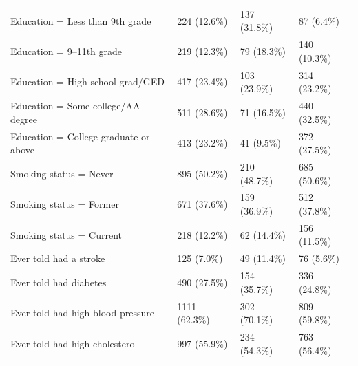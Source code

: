 \documentclass[12pt]{article}
\begin{document}
\begin{longtable}{p{6.6cm}R{2.6cm}R{2.6cm}R{2.6cm}}
Education = Less than 9th grade & 224 (12.6\%) & 137 (31.8\%) & 87 (6.4\%) \\
Education = 9--11th grade & 219 (12.3\%) & 79 (18.3\%) & 140 (10.3\%) \\
Education = High school grad/GED & 417 (23.4\%) & 103 (23.9\%) & 314 (23.2\%) \\
Education = Some college/AA degree & 511 (28.6\%) & 71 (16.5\%) & 440 (32.5\%) \\
Education = College graduate or above & 413 (23.2\%) & 41 (9.5\%) & 372 (27.5\%) \\
Smoking status = Never & 895 (50.2\%) & 210 (48.7\%) & 685 (50.6\%) \\
Smoking status = Former & 671 (37.6\%) & 159 (36.9\%) & 512 (37.8\%) \\
Smoking status = Current & 218 (12.2\%) & 62 (14.4\%) & 156 (11.5\%) \\
Ever told had a stroke & 125 (7.0\%) & 49 (11.4\%) & 76 (5.6\%) \\
Ever told had diabetes & 490 (27.5\%) & 154 (35.7\%) & 336 (24.8\%) \\
Ever told had high blood pressure & 1111 (62.3\%) & 302 (70.1\%) & 809 (59.8\%) \\
Ever told had high cholesterol & 997 (55.9\%) & 234 (54.3\%) & 763 (56.4\%) \\
\end{longtable}
\end{document}
